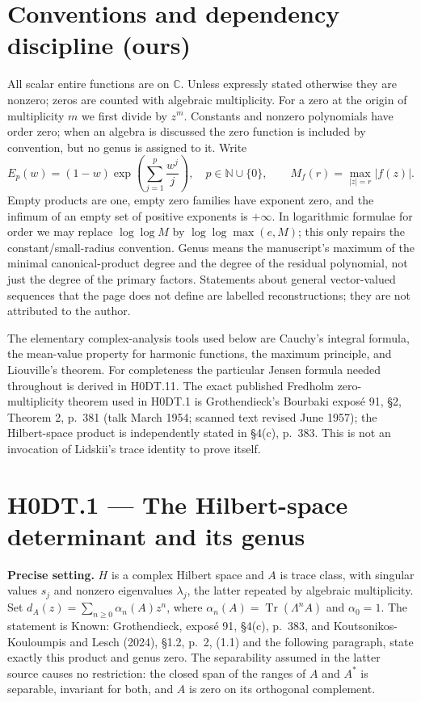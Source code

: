 \providecommand{\ord}{\operatorname{ord}}
\providecommand{\Tr}{\operatorname{Tr}}
\providecommand{\aco}{\operatorname{aco}}
\providecommand{\N}{\mathbb N}
\providecommand{\C}{\mathbb C}

\section*{Conventions and dependency discipline (ours)}
All scalar entire functions are on $\C$. Unless expressly stated otherwise they are nonzero; zeros are counted with algebraic multiplicity. For a zero at the origin of multiplicity $m$ we first divide by $z^m$. Constants and nonzero polynomials have order zero; when an algebra is discussed the zero function is included by convention, but no genus is assigned to it. Write
\[
 E_p(w)=(1-w)\exp\left(\sum_{j=1}^p\frac{w^j}{j}\right),\quad p\in\N\cup\{0\},
 \qquad M_f(r)=\max_{|z|=r}|f(z)|.
\]
Empty products are one, empty zero families have exponent zero, and the infimum of an empty set of positive exponents is $+\infty$. In logarithmic formulae for order we may replace $\log\log M$ by $\log\log\max(e,M)$; this only repairs the constant/small-radius convention. Genus means the manuscript's maximum of the minimal canonical-product degree and the degree of the residual polynomial, not just the degree of the primary factors. Statements about general vector-valued sequences that the page does not define are labelled reconstructions; they are not attributed to the author.

The elementary complex-analysis tools used below are Cauchy's integral formula, the mean-value property for harmonic functions, the maximum principle, and Liouville's theorem. For completeness the particular Jensen formula needed throughout is derived in H0DT.11. The exact published Fredholm zero-multiplicity theorem used in H0DT.1 is Grothendieck's Bourbaki expos\'e 91, \S2, Theorem 2, p.~381 (talk March 1954; scanned text revised June 1957); the Hilbert-space product is independently stated in \S4(c), p.~383. This is not an invocation of Lidskii's trace identity to prove itself.

\section*{H0DT.1 --- The Hilbert-space determinant and its genus}
\textbf{Precise setting.} $H$ is a complex Hilbert space and $A$ is trace class, with singular values $s_j$ and nonzero eigenvalues $\lambda_j$, the latter repeated by algebraic multiplicity. Set $d_A(z)=\sum_{n\ge0}\alpha_n(A)z^n$, where $\alpha_n(A)=\Tr(\Lambda^n A)$ and $\alpha_0=1$. The statement is Known: Grothendieck, expos\'e 91, \S4(c), p.~383, and Koutsonikos-Kouloumpis and Lesch (2024), \S1.2, p.~2, (1.1) and the following paragraph, state exactly this product and genus zero. The separability assumed in the latter source causes no restriction: the closed span of the ranges of $A$ and $A^*$ is separable, invariant for both, and $A$ is zero on its orthogonal complement.

